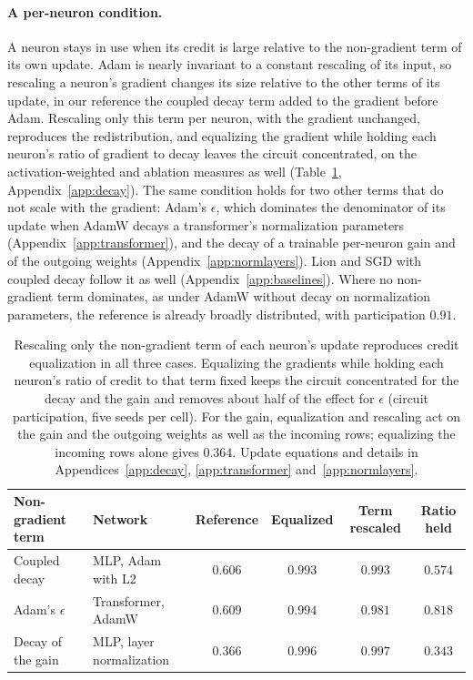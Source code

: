\documentclass{article} %
\begin{document}
\paragraph{A per-neuron condition.} A neuron stays in use when its credit is large relative to the non-gradient term of its own update. Adam is nearly invariant to a constant rescaling of its input, so rescaling a neuron's gradient changes its size relative to the other terms of its update, in our reference the coupled decay term added to the gradient before Adam. Rescaling only this term per neuron, with the gradient unchanged, reproduces the redistribution, and equalizing the gradient while holding each neuron's ratio of gradient to decay leaves the circuit concentrated, on the activation-weighted and ablation measures as well (Table~\ref{tab:pathways}, Appendix~\ref{app:decay}). The same condition holds for two other terms that do not scale with the gradient: Adam's $\epsilon$, which dominates the denominator of its update when AdamW decays a transformer's normalization parameters (Appendix~\ref{app:transformer}), and the decay of a trainable per-neuron gain and of the outgoing weights (Appendix~\ref{app:normlayers}). Lion and SGD with coupled decay follow it as well (Appendix~\ref{app:baselines}). Where no non-gradient term dominates, as under AdamW without decay on normalization parameters, the reference is already broadly distributed, with participation $0.91$.

\begin{table}[t]
\caption{Rescaling only the non-gradient term of each neuron's update reproduces credit equalization in all three cases. Equalizing the gradients while holding each neuron's ratio of credit to that term fixed keeps the circuit concentrated for the decay and the gain and removes about half of the effect for $\epsilon$ (circuit participation, five seeds per cell). For the gain, equalization and rescaling act on the gain and the outgoing weights as well as the incoming rows; equalizing the incoming rows alone gives $0.364$. Update equations and details in Appendices~\ref{app:decay}, \ref{app:transformer} and~\ref{app:normlayers}.}
\label{tab:pathways}
\begin{center}
\footnotesize
\setlength{\tabcolsep}{4pt}
\begin{tabular}{llcccc}
\toprule
Non-gradient term & Network & Reference & Equalized & Term rescaled & Ratio held \\
\midrule
Coupled decay & MLP, Adam with L2 & $0.606$ & $0.993$ & $0.993$ & $0.574$ \\
Adam's $\epsilon$ & Transformer, AdamW & $0.609$ & $0.994$ & $0.981$ & $0.818$ \\
Decay of the gain & MLP, layer normalization & $0.366$ & $0.996$ & $0.997$ & $0.343$ \\
\bottomrule
\end{tabular}
\end{center}
\end{table}
\end{document}
